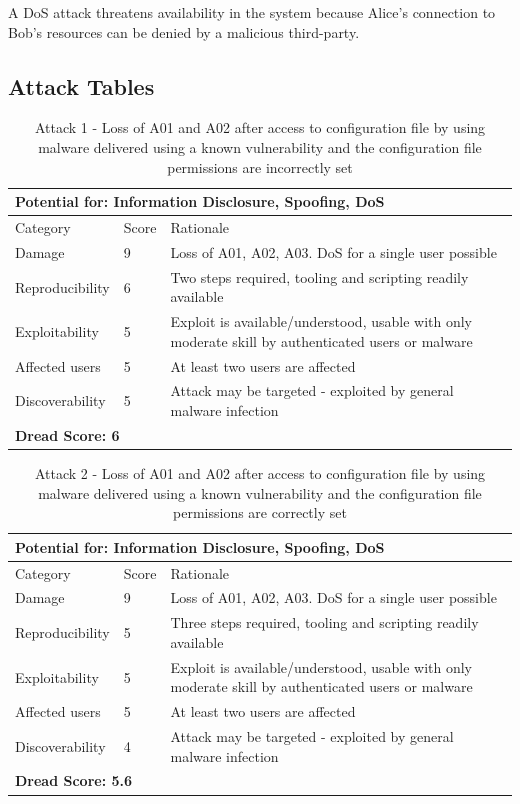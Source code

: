 \documentclass [11pt, proquest] {uwthesis}[2020/02/24]
\begin{document}
A DoS attack threatens availability in the system because Alice's connection to Bob's resources can be denied by a malicious third-party.

\subsection{Attack Tables}
\begin{table}[H]
\label{attack1-ref}
\begin{tabular}{|m{3cm}|m{.9cm}|p{27em} |}
\multicolumn{3}{l}{Potential for: Information Disclosure, Spoofing, DoS}                   \\
\hline
Category & Score & Rationale                                                    \\
\hline
Damage          & 9     & Loss of A01, A02, A03. DoS for a single user possible            \\
\hline
Reproducibility & 6     & Two steps required, tooling and scripting readily available    \\
\hline
Exploitability & 5      & Exploit is available/understood, usable with only moderate skill by authenticated users or malware \\
\hline
Affected users  & 5     & At least two users are affected                     \\
\hline
Discoverability & 5     & Attack may be targeted - exploited by general malware infection \\
\hline
\multicolumn{3}{l}{\textbf{Dread Score: 6}} 
\end{tabular}
\caption{Attack 1 - Loss of A01 and A02 after access to configuration file by using malware delivered using a known vulnerability and the configuration file permissions are incorrectly set}
\end{table}

\begin{table}[H]
\label{attack2-ref}
\begin{tabular}{|m{3cm}|m{.9cm}|p{27em} |}
\multicolumn{3}{l}{Potential for: Information Disclosure, Spoofing, DoS}                   \\
\hline
Category & Score & Rationale \\
\hline
Damage          & 9     & Loss of A01, A02, A03. DoS for a single user possible            \\
\hline
Reproducibility & 5     & Three steps required, tooling and scripting readily available    \\
\hline
Exploitability & 5      & Exploit is available/understood, usable with only moderate skill by authenticated users or malware \\
\hline
Affected users  & 5     & At least two users are affected                      \\
\hline
Discoverability & 4     & Attack may be targeted - exploited by general malware infection \\
\hline
\multicolumn{3}{l}{\textbf{Dread Score: 5.6}} 
\end{tabular}
\caption{Attack 2 - Loss of A01 and A02 after access to configuration file by using malware delivered using a known vulnerability and the configuration file permissions are correctly set}
\end{table}
\end{document}
